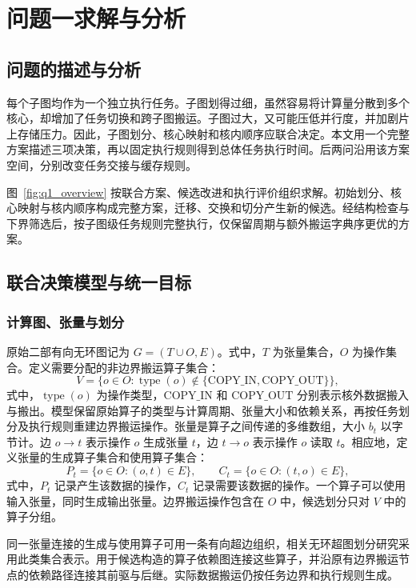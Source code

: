 \section{问题一求解与分析}
\label{sec:q1}
\subsection{问题的描述与分析}
每个子图均作为一个独立执行任务。子图划得过细，虽然容易将计算量分散到多个核心，却增加了任务切换和跨子图搬运。子图过大，又可能压低并行度，并加剧片上存储压力。因此，子图划分、核心映射和核内顺序应联合决定。本文用一个完整方案描述三项决策，再以固定执行规则得到总体任务执行时间。后两问沿用该方案空间，分别改变任务交接与缓存规则。

图~\ref{fig:q1_overview} 按联合方案、候选改进和执行评价组织求解。初始划分、核心映射与核内顺序构成完整方案，迁移、交换和切分产生新的候选。经结构检查与下界筛选后，按子图级任务规则完整执行，仅保留周期与额外搬运字典序更优的方案。


\subsection{联合决策模型与统一目标}
\subsubsection{计算图、张量与划分}
原始二部有向无环图记为 $G=(T\cup O,E)$。式中，$T$ 为张量集合，$O$ 为操作集合。定义需要分配的非边界搬运算子集合：
\begin{equation}
 V=\{o\in O:\operatorname{type}(o)\notin\{\mathrm{COPY\_IN},\mathrm{COPY\_OUT}\}\},
\end{equation}
\noindent 式中，$\operatorname{type}(o)$ 为操作类型，$\mathrm{COPY\_IN}$ 和 $\mathrm{COPY\_OUT}$ 分别表示核外数据搬入与搬出。模型保留原始算子的类型与计算周期、张量大小和依赖关系，再按任务划分及执行规则重建边界搬运操作。张量是算子之间传递的多维数组，大小 $b_t$ 以字节计。边 $o\to t$ 表示操作 $o$ 生成张量 $t$，边 $t\to o$ 表示操作 $o$ 读取 $t$。相应地，定义张量的生成算子集合和使用算子集合：
\begin{equation}
 P_t=\{o\in O:(o,t)\in E\},\qquad C_t=\{o\in O:(t,o)\in E\},
 \label{eq:tensor_incidence}
\end{equation}
\noindent 式中，$P_t$ 记录产生该数据的操作，$C_t$ 记录需要该数据的操作。一个算子可以使用输入张量，同时生成输出张量。边界搬运操作包含在 $O$ 中，候选划分只对 $V$ 中的算子分组。

同一张量连接的生成与使用算子可用一条有向超边组织，相关无环超图划分研究采用此类集合表示\cite{A39}。用于候选构造的算子依赖图连接这些算子，并沿原有边界搬运节点的依赖路径连接其前驱与后继。实际数据搬运仍按任务边界和执行规则生成。

